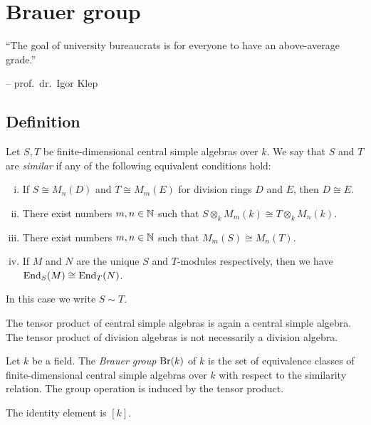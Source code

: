 \section{Brauer group}

\epigraph{``The goal of university bureaucrats is for everyone to
have an above-average grade.''}{-- prof.~dr.~Igor Klep}

\subsection{Definition}

\begin{definicija}
Let $S, T$ be finite-dimensional central simple algebras over $k$.
We say that $S$ and $T$ are \emph{similar}
if any of the following equivalent conditions hold:

\begin{enumerate}[i)]
\item If $S \cong M_n(D)$ and $T \cong M_m(E)$ for division rings
$D$ and $E$, then $D \cong E$.
\item There exist numbers $m, n \in \mathbb{N}$ such that
$S \otimes_k M_m(k) \cong T \otimes_k M_n(k)$.
\item There exist numbers $m, n \in \mathbb{N}$ such that
$M_m(S) \cong M_n(T)$.
\item If $M$ and $N$ are the unique $S$ and $T$-modules
respectively, then we have $\operatorname{End}_S(M) \cong \operatorname{End}_T(N)$.
\end{enumerate}

In this case we write $S \sim T$.
\end{definicija}

\begin{opomba}
The tensor product of central simple algebras is again a central
simple algebra. The tensor product of division algebras is not
necessarily a division algebra.
\end{opomba}

\begin{definicija}
Let $k$ be a field. The \emph{Brauer group}
$\operatorname{Br}(k)$ of $k$ is the set of equivalence classes of
finite-dimensional central simple algebras over $k$ with respect to
the similarity relation. The group operation is induced by the
tensor product.
\end{definicija}

\begin{opomba}
The identity element is $[k]$.
\end{opomba}

